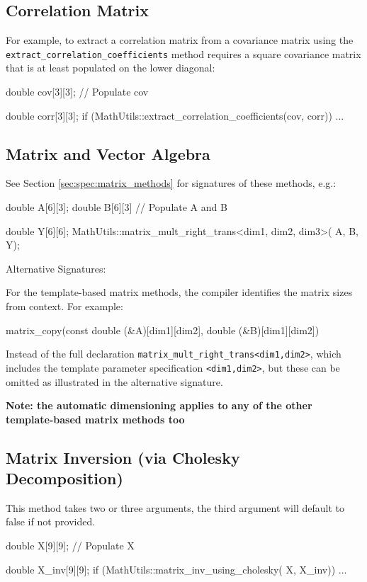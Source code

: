 \documentclass[11pt,fleqn]{report}
\begin{document}
\subsection{Correlation Matrix}
For example, to extract a correlation matrix from a covariance matrix
using the \\\texttt{extract\_correlation\_coefficients} method requires a
square covariance matrix that is at least populated on the lower diagonal:
\begin{code}
double cov[3][3];
// Populate cov

double corr[3][3];
if (MathUtils::extract_correlation_coefficients(cov,
corr)) {
...
}
\end{code}

\subsection{Matrix and Vector Algebra}
See Section \ref{sec:spec:matrix_methods} for signatures of these methods, e.g.:
\begin{code}
double A[6][3];
double B[6][3]
// Populate A and B

double Y[6][6];
MathUtils::matrix_mult_right_trans<dim1, dim2, dim3>( A,
B,
Y);
\end{code}

Alternative Signatures: 

For the template-based matrix methods, the compiler identifies the 
matrix sizes from context. For example:
\begin{code}
matrix_copy(const double (&A)[dim1][dim2],
double (&B)[dim1][dim2])
\end{code}
Instead of the full declaration \texttt{matrix\_mult\_right\_trans<dim1,dim2>},
which includes the template parameter specification \texttt{<dim1,dim2>}, but
these can be omitted as illustrated in the alternative signature.

\textbf{Note: the automatic dimensioning applies to any of the other
template-based matrix methods too}

\subsection {Matrix Inversion (via Cholesky Decomposition)}
This method takes two or three arguments, the third argument will default to
false if not provided.
\begin{code}
double X[9][9];
// Populate X

double X_inv[9][9];
if (MathUtils::matrix_inv_using_cholesky( X,
X_inv)) {
...
}
\end{code}
\end{document}
